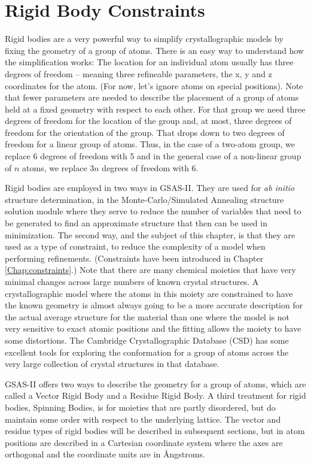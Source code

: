 \chapter{Rigid Body Constraints}\label{Chap:rigidbody}

Rigid bodies are a very powerful way to simplify crystallographic models by fixing the geometry of a group of atoms. There is an easy way to understand how the simplification works: The location for an individual atom usually has three degrees of freedom -- meaning three refineable parameters, the x, y and z coordinates for the atom. (For now, let's ignore atoms on special positions). Note that fewer parameters are needed to describe the placement of a group of atoms held at a fixed geometry with respect to each other. For that group we need three degrees of freedom for the location of the group and, at most, three degrees of freedom for the orientation of the group. That drops down to two degrees of freedom for a linear group of atoms. Thus, in the case of a two-atom group, we replace 6 degrees of freedom with 5 and in the general case of a non-linear group of $n$ atoms, we replace $3n$ degrees of freedom with 6. 

Rigid bodies are employed in two ways in GSAS-II. They are used for \textit{ab initio} structure determination, in the Monte-Carlo/Simulated Annealing structure solution module where they serve to reduce the number of variables that need to be generated to find an approximate structure that then can be used in minimization. The second way, and the subject of this chapter, is that they are used as a type of constraint, to reduce the complexity of a model when performing refinements. (Constraints have been introduced in Chapter \ref{Chap:constraints}.) Note that there are many chemical moieties that have very minimal changes across large numbers of known crystal structures. A crystallographic model where the atoms in this moiety are constrained to have the known geometry is almost always going to be a more accurate description for the actual average structure for the material than one where the model is not very sensitive to exact atomic positions and the fitting allows the moiety to have some distortions. The Cambridge Crystallographic Database (CSD) has some excellent tools for exploring the conformation for a group of atoms across the very large collection of crystal structures in that database. 

GSAS-II offers two ways to describe the geometry for a group of atoms, which are called a Vector Rigid Body and a Residue Rigid Body. A third treatment for rigid bodies, Spinning Bodies, is for moieties that are partly disordered, but do maintain some order with respect to the underlying lattice. The vector and residue types of rigid bodies will be described in subsequent sections, but in atom positions are described in a Cartesian coordinate system where the axes are orthogonal and the coordinate units are in Ångstroms. 

